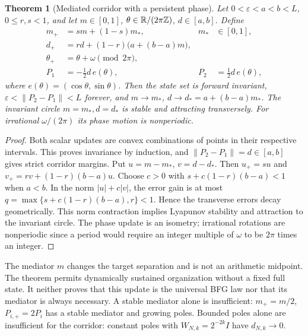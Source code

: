 \documentclass[11pt,letterpaper]{article}
\newtheorem{theorem}{Theorem}[section]
\theoremstyle{definition}
\numberwithin{equation}{section}
\begin{document}
\begin{theorem}[Mediated corridor with a persistent phase]\label{corridorthm}
Let $0<\varepsilon<a<b<L$, $0\leq r,s<1$, and let $m\in[0,1]$, $\theta\in\mathbb R/(2\pi\mathbb Z)$, $d\in[a,b]$. Define
\begin{align}
m_+&=sm+(1-s)m_*,&m_*&\in[0,1],\\
d_+&=rd+(1-r)\bigl(a+(b-a)m\bigr),\\
\theta_+&=\theta+\omega\pmod{2\pi},\\
P_1&=-\tfrac12d\,e(\theta),&P_2&=\tfrac12d\,e(\theta),
\end{align}
where $e(\theta)=(\cos\theta,\sin\theta)$. Then the state set is forward invariant, $\varepsilon<\|P_2-P_1\|<L$ forever, and $m\to m_*$, $d\to d_*=a+(b-a)m_*$. The invariant circle $m=m_*,d=d_*$ is stable and attracting transversely. For irrational $\omega/(2\pi)$ its phase motion is nonperiodic.
\end{theorem}
\begin{proof}
Both scalar updates are convex combinations of points in their respective intervals. This proves invariance by induction, and $\|P_2-P_1\|=d\in[a,b]$ gives strict corridor margins. Put $u=m-m_*$, $v=d-d_*$. Then $u_+=su$ and $v_+=rv+(1-r)(b-a)u$. Choose $c>0$ with $s+c(1-r)(b-a)<1$ when $a<b$. In the norm $|u|+c|v|$, the error gain is at most $q=\max\{s+c(1-r)(b-a),r\}<1$. Hence the transverse errors decay geometrically. This norm contraction implies Lyapunov stability and attraction to the invariant circle. The phase update is an isometry; irrational rotations are nonperiodic since a period would require an integer multiple of $\omega$ to be $2\pi$ times an integer.
\end{proof}
The mediator $m$ changes the target separation and is not an arithmetic midpoint. The theorem permits dynamically sustained organization without a fixed full state. It neither proves that this update is the universal BFG law nor that its mediator is always necessary. A stable mediator alone is insufficient: $m_+=m/2$, $P_{i,+}=2P_i$ has a stable mediator and growing poles. Bounded poles alone are insufficient for the corridor: constant poles with $W_{N,k}=2^{-2k}I$ have $d_{N,k}\to0$.
\end{document}

